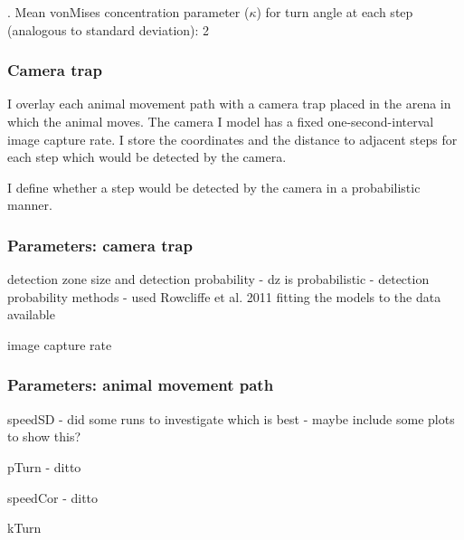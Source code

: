 \documentclass[a4paper,12pt,twoside]{report}
\begin{document}
. Mean vonMises concentration parameter (\begin{math}\kappa\end{math}) for turn angle at each step (analogous to standard deviation): 2
\medskip


\subsubsection{Camera trap}

I overlay each animal movement path with a camera trap placed in the arena in which the animal moves. The camera I model has a fixed one-second-interval image capture rate. I store the coordinates and the distance to adjacent steps for each step which would be detected by the camera. 

I define whether a step would be detected by the camera in a probabilistic manner. 










	
	
	
	
	
	
	
	
	
	
	
	
	
	
	
	
	
	\subsubsection{Parameters: camera trap}
	
	detection zone size and detection probability
	- dz is probabilistic
	- detection probability methods - used Rowcliffe et al. 2011 fitting the models to the data available
	
	
	image capture rate
	
	
	\subsubsection{Parameters: animal movement path}
	
	speedSD
	- did some runs to investigate which is best
	- maybe include some plots to show this?
	
	pTurn
	- ditto
	
	speedCor
	- ditto
	
	kTurn
	
\end{document}
